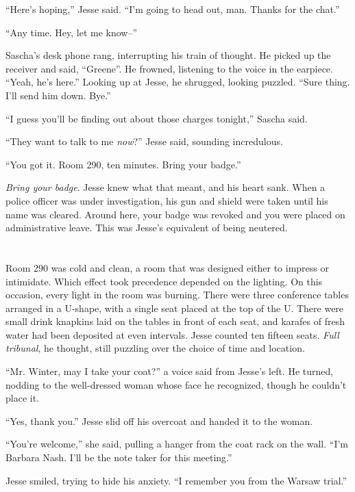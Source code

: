 \documentclass[12pt]{book}
\begin{document}
``Here's hoping,'' Jesse said.  ``I'm going to head out, man.  Thanks for the chat.''

``Any time.  Hey, let me know--''

Sascha's desk phone rang, interrupting his train of thought.  He picked up the receiver and said, ``Greene''.  He frowned, listening to the voice in the earpiece.  ``Yeah, he's here.''  Looking up at Jesse, he shrugged, looking puzzled.  ``Sure thing.  I'll send him down.  Bye.''

``I guess you'll be finding out about those charges tonight,'' Sascha said.

``They want to talk to me \emph{now}?'' Jesse said, sounding incredulous.

``You got it.  Room 290, ten minutes.  Bring your badge.''

\emph{Bring your badge}.  Jesse knew what that meant, and his heart sank.  When a police officer was under investigation, his gun and shield were taken until his name was cleared.  Around here, your badge was revoked and you were placed on administrative leave.  This was Jesse's equivalent of being neutered.

\chapter{}
										
Room 290 was cold and clean, a room that was designed either to impress or intimidate.  Which effect took precedence depended on the lighting.  On this occasion, every light in the room was burning.  There were three conference tables arranged in a U-shape, with a single seat placed at the top of the U.  There were small drink knapkins laid on the tables in front of each seat, and karafes of fresh water had been deposited at even intervals.  Jesse counted ten fifteen seats.  \emph{Full tribunal}, he thought, still puzzling over the choice of time and location.

``Mr. Winter, may I take your coat?'' a voice said from Jesse's left.  He turned, nodding to the well-dressed woman whose face he recognized, though he couldn't place it.

``Yes, thank you.''  Jesse slid off his overcoat and handed it to the woman.

``You're welcome,'' she said, pulling a hanger from the coat rack on the wall.  ``I'm Barbara Nash.  I'll be the note taker for this meeting.''

Jesse smiled, trying to hide his anxiety.  ``I remember you from the Warsaw trial.''
\end{document}

